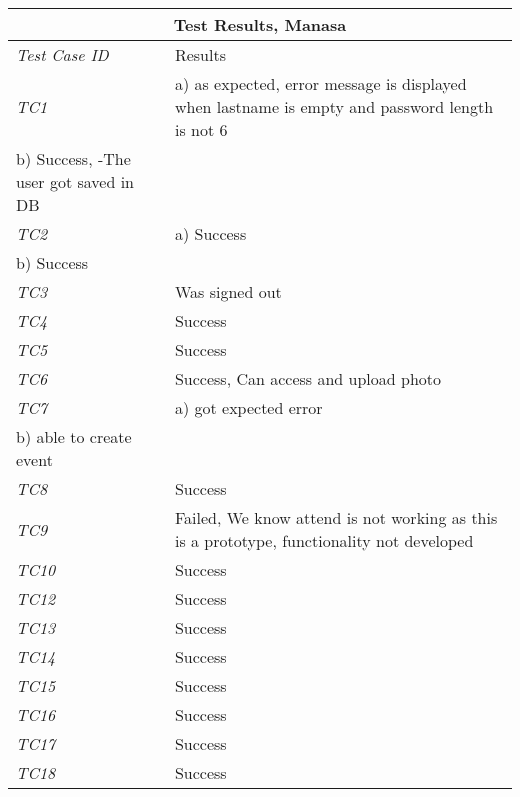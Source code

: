 %
\begin{minipage}{\linewidth}
\setlength{\tabcolsep}{15pt}
\centering
{}
\begin{tabular}{ |l|p{70mm}| }
	\hline
	\multicolumn{2}{|c|}{\cellcolor{gray!25} \textbf{Test Results, Manasa}} \\
	\hline
	\it{\cellcolor{gray!25}Test Case ID} & {\cellcolor{gray!25} Results } \\
	\hline
	\it{\cellcolor{gray!25}TC1} & a) as expected, error message is displayed when lastname is empty and password length is not 6 \\
b) Success, -The user got saved in DB \\ \hline
	\it{\cellcolor{gray!25}TC2} & a) Success\\
b) Success \\ \hline
	\it{\cellcolor{gray!25}TC3} & Was signed out \\ \hline
	\it{\cellcolor{gray!25}TC4} & Success \\ \hline
	\it{\cellcolor{gray!25}TC5} & Success \\ \hline
	\it{\cellcolor{gray!25}TC6} & Success, Can access and upload photo  \\ \hline
	\it{\cellcolor{gray!25}TC7} & a) got expected error \\
b) able to  create event \\ \hline
	\it{\cellcolor{gray!25}TC8} & Success \\ \hline
	\it{\cellcolor{gray!25}TC9} & Failed, We know attend is not working as this is a prototype, functionality not developed \\ \hline
	\it{\cellcolor{gray!25}TC10} & Success \\ \hline
	\it{\cellcolor{gray!25}TC12} & Success \\ \hline
	\it{\cellcolor{gray!25}TC13} & Success \\ \hline
	\it{\cellcolor{gray!25}TC14} & Success \\ \hline
	\it{\cellcolor{gray!25}TC15} & Success \\ \hline
	\it{\cellcolor{gray!25}TC16} & Success \\ \hline
	\it{\cellcolor{gray!25}TC17} & Success \\ \hline
	\it{\cellcolor{gray!25}TC18} & Success \\ \hline
	\hline
\end{tabular}
\medskip
\end{minipage}

